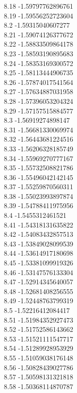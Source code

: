 {8.18	-1.59797762896761\\
8.19	-1.59556252723604\\
8.2	-1.59315040607277\\
8.21	-1.59074126377672\\
8.22	-1.58833509864178\\
8.23	-1.58593190895683\\
8.24	-1.58353169300572\\
8.25	-1.58113444906735\\
8.26	-1.57874017541564\\
8.27	-1.57634887031958\\
8.28	-1.57396053204324\\
8.29	-1.57157515884577\\
8.3	-1.56919274898147\\
8.31	-1.56681330069974\\
8.32	-1.56443681224516\\
8.33	-1.56206328185749\\
8.34	-1.55969270777167\\
8.35	-1.55732508821786\\
8.36	-1.55496042142145\\
8.37	-1.55259870560311\\
8.38	-1.55023993897874\\
8.39	-1.54788411975956\\
8.4	-1.5455312461521\\
8.41	-1.54318131635822\\
8.42	-1.54083432857513\\
8.43	-1.53849028099539\\
8.44	-1.53614917180698\\
8.45	-1.53381099919326\\
8.46	-1.53147576133304\\
8.47	-1.52914345640057\\
8.48	-1.52681408256555\\
8.49	-1.52448763799319\\
8.5	-1.52216412084417\\
8.51	-1.51984352927473\\
8.52	-1.51752586143662\\
8.53	-1.51521111547717\\
8.54	-1.51289928953929\\
8.55	-1.51059038176148\\
8.56	-1.50828439027786\\
8.57	-1.50598131321818\\
8.58	-1.50368114870787\\
}
